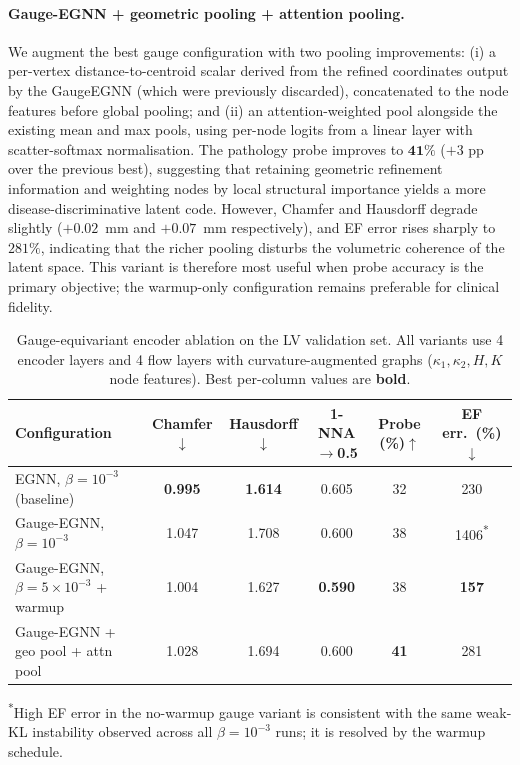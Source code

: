 \documentclass{article}
\begin{document}
\paragraph{Gauge-EGNN + geometric pooling + attention pooling.}
We augment the best gauge configuration with two pooling improvements:
(i) a per-vertex distance-to-centroid scalar derived from the refined
coordinates output by the GaugeEGNN (which were previously discarded),
concatenated to the node features before global pooling; and
(ii) an attention-weighted pool alongside the existing mean and max
pools, using per-node logits from a linear layer with scatter-softmax
normalisation.
The pathology probe improves to $\mathbf{41\%}$ ($+3$ pp over the
previous best), suggesting that retaining geometric refinement information
and weighting nodes by local structural importance yields a more
disease-discriminative latent code.
However, Chamfer and Hausdorff degrade slightly ($+0.02$~mm and
$+0.07$~mm respectively), and EF error rises sharply to $281\%$,
indicating that the richer pooling disturbs the volumetric coherence
of the latent space.
This variant is therefore most useful when probe accuracy is the
primary objective; the warmup-only configuration remains preferable
for clinical fidelity.

\begin{table}[h]
\centering
\caption{Gauge-equivariant encoder ablation on the LV validation set.
         All variants use 4 encoder layers and 4 flow layers with
         curvature-augmented graphs ($\kappa_1, \kappa_2, H, K$ node features).
         Best per-column values are \textbf{bold}.}
\label{tab:gauge_ablations}
\begin{tabular}{lccccc}
\toprule
Configuration & Chamfer$\downarrow$ & Hausdorff$\downarrow$ & 1-NNA$\rightarrow$0.5 & Probe (\%)$\uparrow$ & EF err.\ (\%)$\downarrow$ \\
\midrule
EGNN, $\beta{=}10^{-3}$ (baseline)                   & \textbf{0.995} & \textbf{1.614} & 0.605 & 32 & 230 \\
Gauge-EGNN, $\beta{=}10^{-3}$                         & 1.047 & 1.708 & 0.600 & 38 & 1406\textsuperscript{*} \\
Gauge-EGNN, $\beta{=}5{\times}10^{-3}$ + warmup      & 1.004 & 1.627 & \textbf{0.590} & 38 & \textbf{157} \\
Gauge-EGNN + geo pool + attn pool                     & 1.028 & 1.694 & 0.600 & \textbf{41} & 281 \\
\bottomrule
\end{tabular}
\begin{minipage}{\linewidth}
\vspace{2pt}
\small\textsuperscript{*}High EF error in the no-warmup gauge variant is
consistent with the same weak-KL instability observed across all $\beta{=}
10^{-3}$ runs; it is resolved by the warmup schedule.
\end{minipage}
\end{table}
\end{document}
